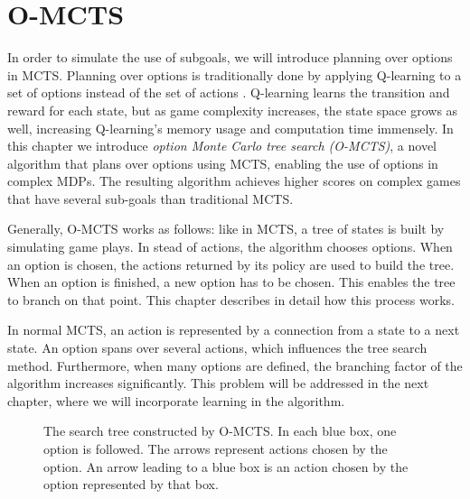 \chapter{O-MCTS}
\label{sec:planning}


In order to simulate the use of subgoals, we will introduce planning over
options in MCTS. Planning over options is traditionally done by
applying Q-learning to a set of options instead of the set of actions
\cite{sutton1999between}. Q-learning learns the transition and reward for each
state, but as game complexity increases, the state space grows as well,
increasing Q-learning's memory usage and computation time immensely. In this
chapter we introduce \emph{option Monte Carlo tree search (O-MCTS)}, a novel
algorithm that plans over options using MCTS, enabling the use of options in
complex MDPs.  The resulting algorithm achieves higher scores on complex games
that have several sub-goals than traditional MCTS.

Generally, O-MCTS works as follows: like in MCTS, a tree of states is
built by simulating game plays. In stead of actions, the algorithm chooses
options. When an option is chosen, the actions returned by its policy are used
to build the tree. When an option is finished, a new option has to be chosen.
This enables the tree to branch on that point. This chapter describes in detail
how this process works.

In normal MCTS, an action is represented by a connection from a state to a next
state. An option spans over several actions, which influences the tree search
method. Furthermore, when many options are defined, the branching factor of the
algorithm increases significantly. This problem will be addressed in the next
chapter, where we will incorporate learning in the algorithm.

\begin{figure}
	\centering
	\caption{The search tree constructed by O-MCTS. In each blue box, one option
	is followed. The arrows represent actions chosen by the option. An arrow
leading to a blue box is an action chosen by the option represented by that box.}
	\label{fig:omcts-tree}
\end{figure}

